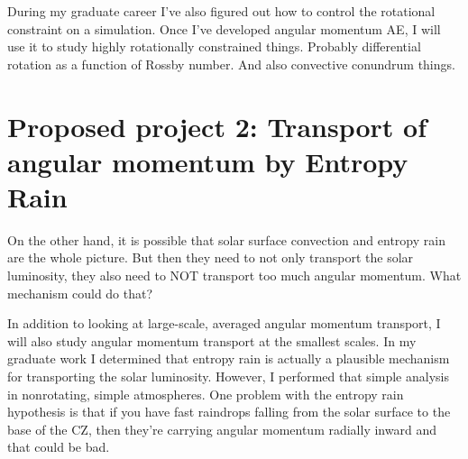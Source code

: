 \documentclass[aasms,12pt]{article}
\begin{document}
During my graduate career I've also figured out how to control the rotational constraint on a simulation.
Once I've developed angular momentum AE, I will use it to study highly rotationally constrained things.
Probably differential rotation as a function of Rossby number.
And also convective conundrum things.

\section{Proposed project 2: Transport of angular momentum by Entropy Rain}
On the other hand, it is possible that solar surface convection and entropy rain are the whole picture.
But then they need to not only transport the solar luminosity, they also need to NOT transport too much angular momentum.
What mechanism could do that?

In addition to looking at large-scale, averaged angular momentum transport, I will also study angular momentum transport at the smallest scales.
In my graduate work I determined that entropy rain is actually a plausible mechanism for transporting the solar luminosity.
However, I performed that simple analysis in nonrotating, simple atmospheres.
One problem with the entropy rain hypothesis is that if you have fast raindrops falling from the solar surface to the base of the CZ, then they're carrying angular momentum radially inward and that could be bad.





\end{document}
